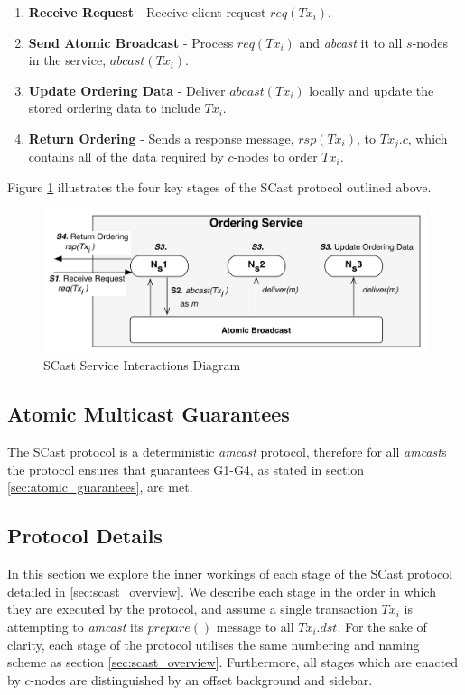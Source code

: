      \begin{enumerate}[label=\bfseries S\arabic*]
        \item    \textbf{Receive Request} - Receive client request $req(Tx_i)$.
        
        \item    \textbf{Send Atomic Broadcast} - Process $req(Tx_i)$ and \emph{abcast} it to all $s$-nodes in the service, $abcast(Tx_i)$.  
        
        \item    \textbf{Update Ordering Data} - Deliver $abcast(Tx_i)$ locally and update the stored ordering data to include $Tx_i$.  
    
        \item    \textbf{Return Ordering} - Sends a response message, $rsp(Tx_i)$, to $Tx_j.c$, which contains all of the data required by $c$-nodes to order $Tx_i$.  
    \end{enumerate}
    
    Figure \ref{fig:scast_service} illustrates the four key stages of the \textsf{SCast} protocol outlined above.  
    
    \begin{figure}[htbp!] 
        \centering    
         \includegraphics[width=1.0\textwidth]{scast_service}
         \caption[SCast Service Interactions]{SCast Service Interactions Diagram}
         \label{fig:scast_service}
    \end{figure}
    
    \subsection{Atomic Multicast Guarantees}
    The \textsf{SCast} protocol is a deterministic \emph{amcast} protocol, therefore for all \emph{amcast}s the protocol ensures that guarantees G1-G4, as stated in section \ref{sec:atomic_guarantees}, are met.      
    
    \subsection{Protocol Details} \label{ssec:scast_details}
    In this section we explore the inner workings of each stage of the \textsf{SCast} protocol detailed in \ref{sec:scast_overview}.  We describe each stage in the order in which they are executed by the protocol, and assume a single transaction $Tx_i$ is attempting to \emph{amcast} its $prepare()$ message to all $Tx_i.dst$.  For the sake of clarity, each stage of the protocol utilises the same numbering and naming scheme as section \ref{sec:scast_overview}. Furthermore, all stages which are enacted by $c$-nodes are distinguished by an offset background and sidebar.  
    
